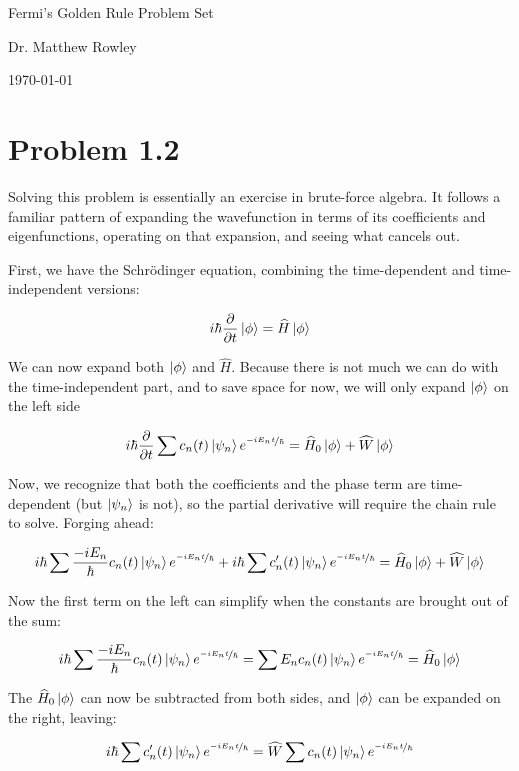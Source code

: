 \documentclass[12pt, openany, letterpaper]{memoir}
\begin{document}
	\begin{center}
		{\Large Fermi's Golden Rule Problem Set}
		
		Dr. Matthew Rowley
		
		\today
	\end{center}

\section*{Problem 1.2}
Solving this problem is essentially an exercise in brute-force algebra. It follows a familiar pattern of expanding the wavefunction in terms of its coefficients and eigenfunctions, operating on that expansion, and seeing what cancels out.

First, we have the Schr\"odinger equation, combining the time-dependent and time-independent versions:

$$
	i\hbar\frac{\partial}{\partial t}\left| \phi \right> = \widehat{H}\left| \phi \right>
$$

We can now expand both $\left| \phi \right>$ and $\widehat{H}$. Because there is not much we can do with the time-independent part, and to save space for now, we will only expand $\left| \phi \right>$ on the left side

$$
i\hbar\frac{\partial}{\partial t}\sum c_n(t)\left| \psi_n \right>e^{\nicefrac{-iE_nt}{\hbar}} = \widehat{H}_0\left| \phi \right> + \widehat{W}\left| \phi \right>
$$

Now, we recognize that both the coefficients and the phase term are time-dependent (but $\left| \psi_n \right>$ is not), so the partial derivative will require the chain rule to solve. Forging ahead:

$$
i\hbar\sum \frac{-iE_n}{\hbar}c_n(t)\left| \psi_n \right>e^{\nicefrac{-iE_nt}{\hbar}} + i\hbar\sum c^\prime_n(t)\left| \psi_n \right>e^{\nicefrac{-iE_nt}{\hbar}} = \widehat{H}_0\left| \phi \right> + \widehat{W}\left| \phi \right>
$$

Now the first term on the left can simplify when the constants are brought out of the sum:

$$
i\hbar\sum \frac{-iE_n}{\hbar}c_n(t)\left| \psi_n \right>e^{\nicefrac{-iE_nt}{\hbar}} = \sum E_nc_n(t)\left| \psi_n \right>e^{\nicefrac{-iE_nt}{\hbar}} = \widehat{H}_0\left| \phi \right>
$$

The $\widehat{H}_0\left| \phi \right>$ can now be subtracted from both sides, and $\left| \phi \right>$ can be expanded on the right, leaving:

$$
i\hbar\sum c^\prime_n(t)\left| \psi_n \right>e^{\nicefrac{-iE_nt}{\hbar}} =  \widehat{W}\sum c_n(t)\left| \psi_n \right>e^{\nicefrac{-iE_nt}{\hbar}}
$$
\end{document}

